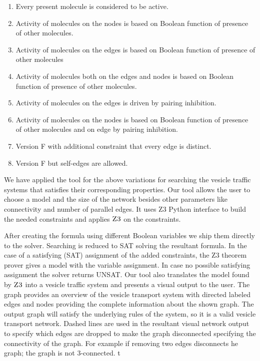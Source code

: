 \begin{enumerate}[label=\Alph*]
\item Every present molecule is considered to be active.
\item Activity of molecules on the nodes is based on Boolean function of presence of other molecules. 
\item Activity of molecules on the edges is based on Boolean function of presence of other molecules
\item Activity of molecules both on the edges and nodes is based on Boolean function of presence of other molecules.
\item Activity of molecules on the edges is driven by pairing inhibition.
\item Activity of molecules on the nodes is based on Boolean function of presence of other molecules and on edge by pairing inhibition.
\item Version F with additional constraint that every edge is distinct.
\item Version F but self-edges are allowed.
\end{enumerate}
%
We have applied the tool for the above variations for searching the vesicle traffic systems that satisfies
their corresponding properties. Our tool allows the user to choose a model and the size of the network besides other parameters like connectivity and number of parallel edges. It uses Z3 Python interface to build the needed constraints and applies $\textsc{Z3}$ on the constraints. 

After creating the formula using different Boolean variables we ship them directly to the solver. Searching is reduced to SAT solving the resultant formula. In the case of a satisfying (SAT) assignment of the added constraints, the Z3 theorem prover gives a model with the variable assignment. In case no possible satisfying assignment the solver returns UNSAT.
%
Our tool also translates the model found by $\textsc{Z3}$ into a vesicle traffic system and presents a visual
output to the user. The graph provides an overview of the vesicle transport system with directed labeled edges and nodes providing the complete information about the shown graph. The output graph will satisfy the underlying rules of the system, so it is a valid vesicle transport network. Dashed lines are used in the resultant visual network output to specify which edges are dropped to make the graph disconnected specifying the connectivity of the graph. For example if removing two edges disconnects he graph; the graph is not 3-connected.
t


